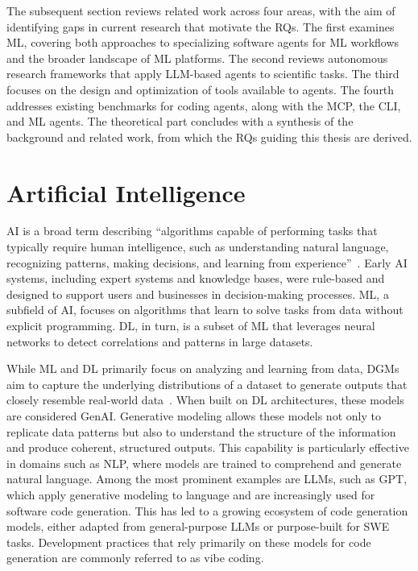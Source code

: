\documentclass[
english,                 %
bibtex,                  %
includeExtraAbstracts, %
]{kththesis}
\numberwithin{listing}{chapter}
\begin{document}
The subsequent section reviews related work across four areas, with the aim of identifying gaps in current research that motivate the \glspl{RQ}. The first examines \gls{ML}, covering both approaches to specializing software agents for \gls{ML} workflows and the broader landscape of \gls{ML} platforms. The second reviews autonomous research frameworks that apply \gls{LLM}-based agents to scientific tasks. The third focuses on the design and optimization of tools available to agents. The fourth addresses existing benchmarks for coding agents, along with the \gls{MCP}, the \gls{CLI}, and \gls{ML} agents. The theoretical part concludes with a synthesis of the background and related work, from which the \glspl{RQ} guiding this thesis are derived.

\section{Artificial Intelligence}
\glsresetall

\Gls{AI} is a broad term describing “algorithms capable of performing tasks that typically require human intelligence, such as understanding natural language, recognizing patterns, making decisions, and learning from experience”~\cite{banh_generative_2023}. Early \gls{AI} systems, including expert systems and knowledge bases, were rule-based and designed to support users and businesses in decision-making processes. \Gls{ML}, a subfield of \gls{AI}, focuses on algorithms that learn to solve tasks from data without explicit programming. \Gls{DL}, in turn, is a subset of \gls{ML} that leverages neural networks to detect correlations and patterns in large datasets.

While \gls{ML} and \gls{DL} primarily focus on analyzing and learning from data, \glspl{DGM} aim to capture the underlying distributions of a dataset to generate outputs that closely resemble real-world data~\cite{banh_generative_2023}. When built on \gls{DL} architectures, these models are considered \gls{GenAI}. Generative modeling allows these models not only to replicate data patterns but also to understand the structure of the information and produce coherent, structured outputs. This capability is particularly effective in domains such as \gls{NLP}, where models are trained to comprehend and generate natural language. Among the most prominent examples are \glspl{LLM}, such as \gls{GPT}, which apply generative modeling to language and are increasingly used for software code generation. This has led to a growing ecosystem of code generation models, either adapted from general-purpose \glspl{LLM} or purpose-built for \gls{SWE} tasks. Development practices that rely primarily on these models for code generation are commonly referred to as vibe coding.
\end{document}
